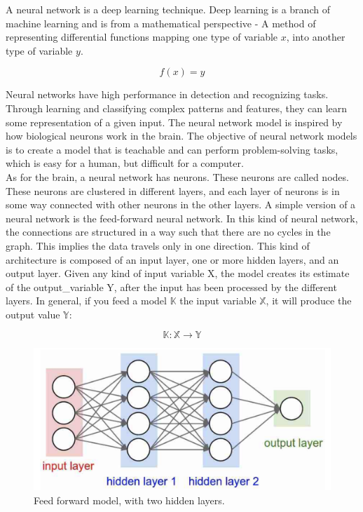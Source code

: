 A neural network is a deep learning technique. Deep learning is a branch of machine learning and is from a mathematical perspective - A method of representing differential functions mapping one type of variable $x$, into another type of variable $y$.

$$
f(x) = y
$$

\noindent
Neural networks have high performance in detection and recognizing tasks. Through learning and classifying complex patterns and features, they can learn some representation of a given input. The neural network model is inspired by how biological neurons work in the brain. The objective of neural network models is to create a model that is teachable and can perform problem-solving tasks, which is easy for a human, but difficult for a computer.\\

\noindent
As for the brain, a neural network has neurons. These neurons are called nodes. These neurons are clustered in different layers, and each layer of neurons is in some way connected with other neurons in the other layers. A simple version of a neural network is the feed-forward neural network. In this kind of neural network, the connections are structured in a way such that there are no cycles in the graph. This implies the data travels only in one direction. This kind of architecture is composed of an input layer, one or more hidden layers, and an output layer. Given any kind of input variable X, the model creates its estimate of the output\_variable Y, after the input has been processed by the different layers.
In general, if you feed a model $\mathbb{K}$ the input variable $\mathbb{X}$, it will produce the output value $\mathbb{Y}:$

$$
\mathbb{K}: \mathbb{X} \to \mathbb{Y}
$$

\begin{figure}[!ht]
  \centering
  \includegraphics[scale=0.4]{latex/imgs/NN.png}
  \caption{Feed forward model, with two hidden layers.}\label{Baseline:before}
\end{figure}

